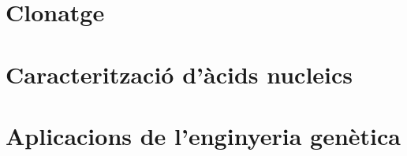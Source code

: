 \documentclass[a4paper,oneside,12pt]{article}
\begin{document}
\newpage
{}
\part{Clonatge}


\newpage
{}
\part{Caracterització d'àcids nucleics}


\newpage
{}
\part{Aplicacions de l'enginyeria genètica}


\newpage
{}
{}
\begin{multicols}{2}
 

\end{multicols}
\end{document}
